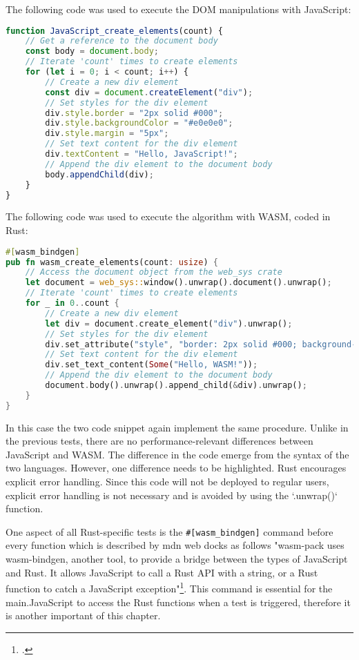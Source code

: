The following code was used to execute the DOM manipulations with JavaScript:
\begin{lstlisting}[language=JavaScript, caption={DOM manipulation in JavaScript, source: self-coded}]
function JavaScript_create_elements(count) {
    // Get a reference to the document body
    const body = document.body;
    // Iterate 'count' times to create elements
    for (let i = 0; i < count; i++) {
        // Create a new div element
        const div = document.createElement("div");
        // Set styles for the div element
        div.style.border = "2px solid #000";
        div.style.backgroundColor = "#e0e0e0";
        div.style.margin = "5px";
        // Set text content for the div element
        div.textContent = "Hello, JavaScript!";
        // Append the div element to the document body
        body.appendChild(div);
    }
}
\end{lstlisting}

The following code was used to execute the algorithm with WASM, coded in Rust:
\begin{lstlisting}[language=Rust, caption={DOM manipulation in Rust, source: self-coded}]
#[wasm_bindgen]
pub fn wasm_create_elements(count: usize) {
    // Access the document object from the web_sys crate
    let document = web_sys::window().unwrap().document().unwrap();
    // Iterate 'count' times to create elements
    for _ in 0..count {
        // Create a new div element
        let div = document.create_element("div").unwrap();
        // Set styles for the div element
        div.set_attribute("style", "border: 2px solid #000; background-color: #e0e0e0; margin: 5px;").unwrap();
        // Set text content for the div element
        div.set_text_content(Some("Hello, WASM!"));
        // Append the div element to the document body
        document.body().unwrap().append_child(&div).unwrap();
    }
}
\end{lstlisting}

In this case the two code snippet again implement the same procedure. Unlike in the previous tests, there are no performance-relevant differences between JavaScript and WASM. The difference in the code emerge from the syntax of the two languages. However, one difference needs to be highlighted. Rust encourages explicit error handling. Since this code will not be deployed to regular users, explicit error handling is not necessary and is avoided by using the `.unwrap()` function.

One aspect of all Rust-specific tests is the \texttt{\#[wasm\_bindgen]} command before every function which is described by mdn web docks as follows "wasm-pack uses wasm-bindgen, another tool, to provide a bridge between the types of JavaScript and Rust. It allows JavaScript to call a Rust API with a string, or a Rust function to catch a JavaScript exception"\footcite{mozilla_compiling_nodate}. This command is essential for the main.JavaScript to access the Rust functions when a test is triggered, therefore it is another important of this chapter. 